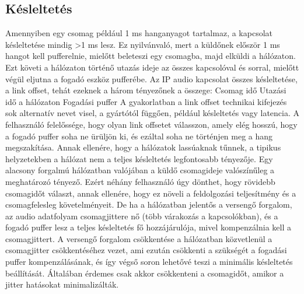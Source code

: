 \subsection{Késleltetés}
Amennyiben egy csomag például 1 ms hanganyagot tartalmaz, a kapcsolat
késleltetése mindig >1 ms lesz. Ez nyilvánvaló, mert a küldőnek először 1 ms
hangot kell pufferelnie, mielőtt beleteszi egy csomagba, majd elküldi a
hálózaton. Ezt követi a hálózaton történő utazás ideje az összes kapcsolóval és
sorral, mielőtt végül eljutna a fogadó eszköz pufferébe. Az IP audio kapcsolat
összes késleltetése, a link offset, tehát ezeknek a három tényezőnek a összege:
Csomag idő Utazási idő a hálózaton Fogadási puffer A gyakorlatban a link offset
technikai kifejezés sok alternatív nevet visel, a gyártótól függően, például
késleltetés vagy latencia. A felhasználó felelőssége, hogy olyan link offsetet
válasszon, amely elég hosszú, hogy a fogadó puffer soha ne ürüljön ki, és
ezáltal soha ne történjen meg a hang megszakítása. Annak ellenére, hogy a
hálózatok lassúaknak tűnnek, a tipikus helyzetekben a hálózat nem a teljes
késleltetés legfontosabb tényezője. Egy alacsony forgalmú hálózatban valójában a
küldő csomagideje valószínűleg a meghatározó tényező. Ezért néhány felhasználó
úgy dönthet, hogy rövidebb csomagidőt választ, annak ellenére, hogy ez növeli a
feldolgozási teljesítmény és a csomagfelesleg követelményeit. De ha a hálózatban
jelentős a versengő forgalom, az audio adatfolyam csomagjittere nő (több
várakozás a kapcsolókban), és a fogadó puffer lesz a teljes késleltetés fő
hozzájárulója, mivel kompenzálnia kell a csomagjittert. A versengő forgalom
csökkentése a hálózatban közvetlenül a csomagjitter csökkentéséhez vezet, ami
ezután csökkenti a szükségét a fogadási puffer kompenzálásának, és így végső
soron lehetővé teszi a minimális késleltetés beállítását. Általában érdemes csak
akkor csökkenteni a csomagidőt, amikor a jitter hatásokat minimalizálták.






